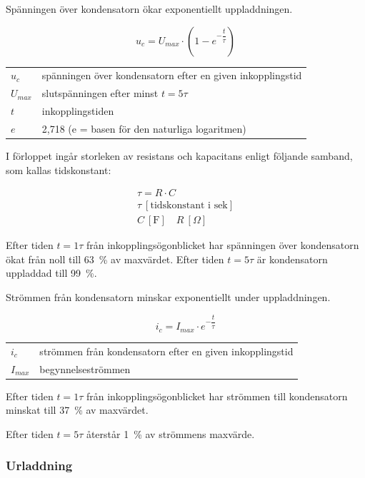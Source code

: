 Spänningen över kondensatorn ökar exponentiellt uppladdningen.

\[u_c = U_{max} \cdot ( 1 - e^{-\dfrac{t}{\tau}} )\]

\begin{tabular}{lp{}}
  \(u_c\)     & spänningen över kondensatorn efter en given inkopplingstid \\
  \(U_{max}\) & slutspänningen efter minst \(t = 5\tau\) \\
  \(t\)       & inkopplingstiden \\
  \(e\)       & 2,718 (e = basen för den naturliga logaritmen) \\
\end{tabular}

I förloppet ingår storleken av resistans och kapacitans enligt följande samband,
som kallas tidskonstant:

\begin{gather*}
  \tau = R \cdot C \\
  \tau\ [\text{tidskonstant i sek}] \\
  C\ [\text{F}] \quad R\ [\Omega]
\end{gather*}

Efter tiden \(t = 1\tau\) från inkopplingsögonblicket har spänningen över
kondensatorn ökat från noll till 63~\% av maxvärdet.
Efter tiden \(t = 5\tau\) är kondensatorn uppladdad till 99~\%.

Strömmen från kondensatorn minskar exponentiellt under uppladdningen.

\[i_c = I_{max} \cdot e^{-\dfrac{t}{\tau}}\]

\begin{tabular}{lp{}}
  \(i_c\) & strömmen från kondensatorn efter en given inkopplingstid \\
  \(I_{max}\) & begynnelseströmmen \\
\end{tabular}

Efter tiden \(t = 1\tau\) från inkopplingsögonblicket har strömmen till
kondensatorn minskat till 37~\% av maxvärdet.

Efter tiden \(t = 5\tau\) återstår 1~\% av strömmens maxvärde.

\subsubsection{Urladdning}

